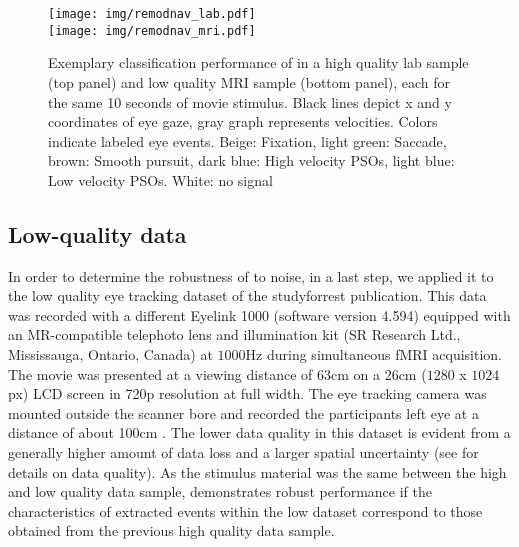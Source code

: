 \begin{figure*}[tbp]
  \texttt{[image: img/remodnav\_lab.pdf]} \\
  \texttt{[image: img/remodnav\_mri.pdf]}\\
  \caption{Exemplary classification performance of \remodnav in a high quality lab sample (top panel) and low
  quality MRI sample (bottom panel), each for the same 10 seconds of movie stimulus.
  Black lines depict x and y coordinates of eye gaze, gray graph represents velocities. Colors indicate labeled
  eye events. Beige: Fixation,
  light green: Saccade, brown: Smooth pursuit, dark blue: High velocity PSOs, light blue: Low velocity PSOs.
  White: no signal
  }

  \label{fig:remodnav}
\end{figure*}


\subsection*{Low-quality data}\label{ana_3}

In order to determine the robustness of \remodnav to noise, in a last step, we
applied it to the low quality eye tracking dataset of the studyforrest
publication. This data was recorded with a different Eyelink 1000 (software
version 4.594) equipped with an MR-compatible telephoto lens and illumination
kit (SR Research Ltd., Mississauga, Ontario, Canada) at $1000$Hz during
simultaneous fMRI acquisition. The movie was presented at a viewing distance of
$63$cm on a 26cm ($1280$ x $1024$px) LCD screen in 720p resolution at full
width. The eye tracking camera was mounted outside the scanner bore and
recorded the participants left eye at a distance of about 100cm
\citep{Hanke2016}.  The lower data quality in this dataset is evident from a
generally higher amount of data loss and a larger spatial uncertainty (see
\citet{Hanke2016} for details on data quality). As the stimulus material was
the same between the high and low quality data sample, \remodnav demonstrates
robust performance if the characteristics of extracted events within the low
dataset correspond to those obtained from the previous high quality data
sample.

